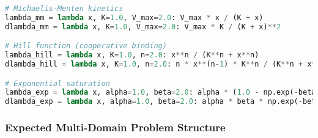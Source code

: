 \begin{lstlisting}[language=Python, caption=Expected Alternative Lambda Functions]
# Michaelis-Menten kinetics
lambda_mm = lambda x, K=1.0, V_max=2.0: V_max * x / (K + x)
dlambda_mm = lambda x, K=1.0, V_max=2.0: V_max * K / (K + x)**2

# Hill function (cooperative binding)  
lambda_hill = lambda x, K=1.0, n=2.0: x**n / (K**n + x**n)
dlambda_hill = lambda x, K=1.0, n=2.0: n * x**(n-1) * K**n / (K**n + x**n)**2

# Exponential saturation
lambda_exp = lambda x, alpha=1.0, beta=2.0: alpha * (1.0 - np.exp(-beta * x))
dlambda_exp = lambda x, alpha=1.0, beta=2.0: alpha * beta * np.exp(-beta * x)
\end{lstlisting}

\subsubsection{Expected Multi-Domain Problem Structure}

